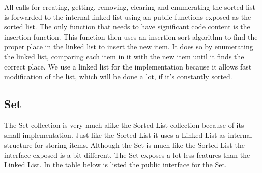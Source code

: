 \documentclass[table]{ituthesis}
\begin{document}
	All calls for creating, getting, removing, clearing and enumerating the sorted list is forwarded to the internal linked list using an public functions exposed as the sorted list. The only function that needs to have significant code content is the insertion function. This function then uses an insertion sort algorithm to find the proper place in the linked list to insert the new item. It does so by enumerating the linked list, comparing each item in it with the new item until it finds the correct place. We use a linked list for the implementation because it allows fast modification of the list, which will be done a lot, if it's constantly sorted.
	
	\subsection{Set}
	
	The Set collection is very much alike the Sorted List collection because of its small implementation. Just like the Sorted List it uses a Linked List as internal structure for storing items. Although the Set is much like the Sorted List the interface exposed is a bit different. The Set exposes a lot less features than the Linked List. In the table below is listed the public interface for the Set.
	
\end{document}
